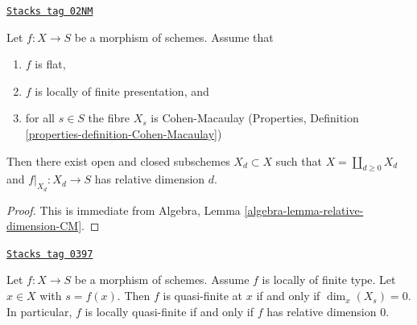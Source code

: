 \begin{lemma}
\label{morphisms-lemma-flat-finite-presentation-CM-fibres-relative-dimension}
\href{https://stacks.math.columbia.edu/tag/02NM}{\texttt{Stacks tag 02NM}}


Let $f : X \to S$ be a morphism of schemes.
Assume that
\begin{enumerate}
\item $f$ is flat,
\item $f$ is locally of finite presentation, and
\item for all $s \in S$ the fibre $X_s$ is Cohen-Macaulay
(Properties, Definition \ref{properties-definition-Cohen-Macaulay})
\end{enumerate}
Then there exist open and closed subschemes $X_d \subset X$
such that $X = \coprod_{d \geq 0} X_d$ and $f|_{X_d} : X_d \to S$
has relative dimension $d$.
\end{lemma}

\begin{proof}
This is immediate from
Algebra, Lemma
\ref{algebra-lemma-relative-dimension-CM}.
\end{proof}

\begin{lemma}
\label{morphisms-lemma-locally-quasi-finite-rel-dimension-0}
\href{https://stacks.math.columbia.edu/tag/0397}{\texttt{Stacks tag 0397}}

Let $f : X \to S$ be a morphism of schemes.
Assume $f$ is locally of finite type.
Let $x \in X$ with $s = f(x)$.
Then $f$ is quasi-finite at $x$ if and only if $\dim_x(X_s) = 0$.
In particular, $f$ is locally quasi-finite if and only if $f$ has relative
dimension $0$.
\end{lemma}

